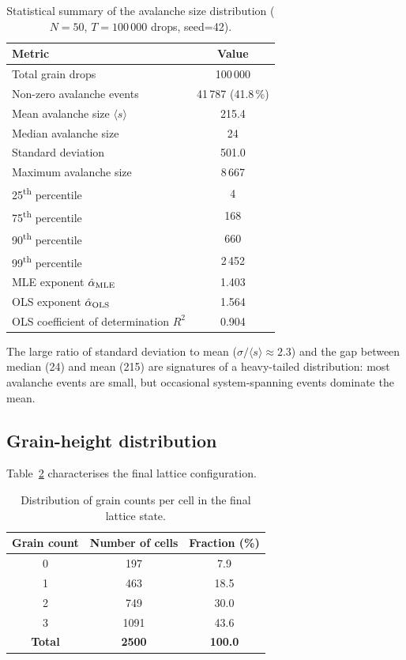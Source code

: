 \documentclass[12pt,a4paper]{article}
\begin{document}
\begin{table}[H]
\centering
\caption{Statistical summary of the avalanche size distribution ($N=50$,
         $T=100\,000$ drops, seed=42).}
\label{tab:results}
\begin{tabular}{lc}
\toprule
\textbf{Metric} & \textbf{Value} \\
\midrule
Total grain drops              & 100\,000 \\
Non-zero avalanche events      & 41\,787 (41.8\,\%) \\
Mean avalanche size $\langle s\rangle$  & 215.4 \\
Median avalanche size          & 24 \\
Standard deviation             & 501.0 \\
Maximum avalanche size         & 8\,667 \\
25\textsuperscript{th} percentile & 4 \\
75\textsuperscript{th} percentile & 168 \\
90\textsuperscript{th} percentile & 660 \\
99\textsuperscript{th} percentile & 2\,452 \\
\midrule
MLE exponent $\hat\alpha_{\rm MLE}$ & 1.403 \\
OLS exponent $\hat\alpha_{\rm OLS}$ & 1.564 \\
OLS coefficient of determination $R^2$ & 0.904 \\
\bottomrule
\end{tabular}
\end{table}

\noindent The large ratio of standard deviation to mean ($\sigma/\langle s\rangle \approx 2.3$)
and the gap between median (24) and mean (215) are signatures of a heavy-tailed
distribution: most avalanche events are small, but occasional system-spanning events
dominate the mean.

\subsection{Grain-height distribution}

Table~\ref{tab:heights} characterises the final lattice configuration.

\begin{table}[H]
\centering
\caption{Distribution of grain counts per cell in the final lattice state.}
\label{tab:heights}
\begin{tabular}{ccc}
\toprule
\textbf{Grain count} & \textbf{Number of cells} & \textbf{Fraction (\%)} \\
\midrule
0 & 197  & 7.9  \\
1 & 463  & 18.5 \\
2 & 749  & 30.0 \\
3 & 1091 & 43.6 \\
\midrule
\textbf{Total} & \textbf{2500} & \textbf{100.0} \\
\bottomrule
\end{tabular}
\end{table}
\end{document}
